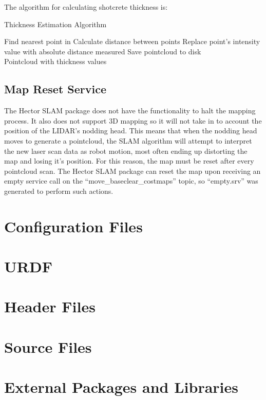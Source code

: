 The algorithm for calculating shotcrete thickness is:

\begin{algorithm}[H]
\caption{Thickness Estimation Algorithm}
\label{alg:thick}
\begin{algorithmic}[1]
\begin{raggedright}
\State Find nearest point in 
\State Calculate distance between points
\State Replace point's intensity value with absolute distance measured
\EndFor
\State Save pointcloud to disk
\EndFunction\\
\Return Pointcloud with thickness values
\end{raggedright}
\end{algorithmic}
\end{algorithm}

\subsection{Map Reset Service}
The Hector SLAM package does not have the functionality to halt the mapping process. It also does not support 3D mapping so it will not take in to account the position of the LIDAR's nodding head. This means that when the nodding head moves to generate a pointcloud, the SLAM algorithm will attempt to interpret the new laser scan data as robot motion, most often ending up distorting the map and losing it's position. For this reason, the map must be reset after every pointcloud scan. The Hector SLAM package can reset the map upon receiving an empty service call on the ``move\_base\/clear\_costmaps'' topic, so ``empty.srv'' was generated to perform such actions.\\


\section{Configuration Files}
\section{URDF}
\section{Header Files}
\section{Source Files}
\label{sec:meat}
\section{External Packages and Libraries}
\label{sec:extpkg}
